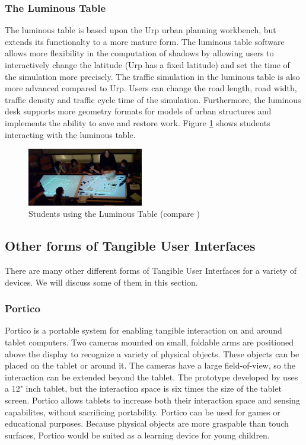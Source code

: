 \subsubsection{The Luminous Table}
The luminous table is based upon the Urp urban planning workbench, but extends its functionalty to a more mature form. The luminous table software allows more flexibility in the computation of shadows by allowing users to interactively change the latitude (Urp has a fixed latitude) and set the time of the simulation more precisely. The traffic simulation in the luminous table is also more advanced compared to Urp. Users can change the road length, road width, traffic density and traffic cycle time of the simulation. Furthermore, the luminous desk supports more geometry formats for models of urban structures and implements the ability to save and restore work. Figure \ref{fig:luminous_table} shows students interacting with the luminous table. 

\begin{figure}
\centering
\includegraphics[width=0.45\textwidth]{figures/luminous_table.pdf}
\caption{Students using the Luminous Table (compare )}
\label{fig:luminous_table}
\end{figure}

\subsection {Other forms of Tangible User Interfaces}
There are many other different forms of Tangible User Interfaces for a variety of devices. We will discuss some of them in this section. 

\subsubsection{Portico}
Portico is a portable system for enabling tangible interaction on and around tablet computers. Two cameras mounted on small, foldable arms are positioned above the display to recognize a variety of physical objects. These objects can be placed on the tablet or around it. The cameras have a large field-of-view, so the interaction can be extended beyond the tablet. The prototype developed by \cite{avrahami11} uses a 12" inch tablet, but the interaction space is six times the size of the tablet screen. Portico allows tablets to increase both their interaction space and sensing capabilites, without sacrificing portability. Portico can be used for games or educational purposes. Because physical objects are more graspable than touch surfaces, Portico would be suited as a learning device for young children. 


